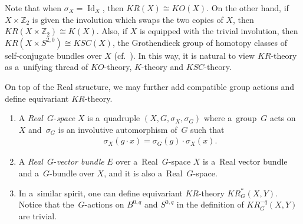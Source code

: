 \documentclass[11pt]{article}
\numberwithin{equation}{section}
\DeclareMathOperator{\Id}{Id}
\begin{document}
Note that when $\sigma_X=\Id_X$, then $KR(X)\cong KO(X)$.
On the other hand, if $X\times \mathbb{Z}_2$ is given the involution which swaps the two copies of $X$, then
$KR(X\times\mathbb{Z}_2)\cong K(X)$.
Also, if $X$ is equipped with the trivial involution, then $KR(X\times S^{2,0})\cong KSC(X)$, the Grothendieck group of
homotopy classes of self-conjugate bundles over $X$ (cf.~\cite{At3}).
In this way, it is natural to view $KR$-theory as a~unifying thread of $KO$-theory, $K$-theory and $KSC$-theory.

On top of the Real structure, we may further add compatible group actions and def\/ine equivariant $KR$-theory.
\begin{Definition}\label{eqkrtheory}\quad
\begin{enumerate}\itemsep=0pt
\item
A \emph{Real}~$G$-\emph{space} $X$ is a~quadruple $(X, G,
\sigma_X, \sigma_G)$ where a~group~$G$ acts on~$X$ and~$\sigma_G$ is an involutive automorphism of~$G$ such that
\begin{gather*}
\sigma_X(g\cdot x)=\sigma_G(g)\cdot\sigma_X(x).
\end{gather*}
\item
A \emph{Real}~$G$-\emph{vector bundle} $E$ over a~Real~$G$-space $X$ is a~Real vector bundle and a~$G$-bundle over $X$,
and it is also a~Real~$G$-space.
\item
In a~similar spirit, one can def\/ine equivariant $KR$-theory $KR_G^*(X, Y)$.
Notice that the~$G$-actions on $B^{0,q}$ and $S^{0,q}$ in the def\/inition of $KR_G^{-q}(X, Y)$ are trivial.
\end{enumerate}
\end{Definition}
\end{document}
